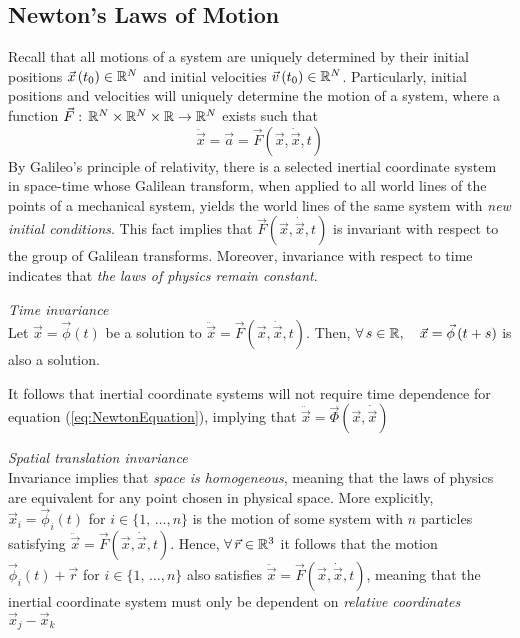 \documentclass{article}
\begin{document}
		\subsection{Newton's Laws of Motion}
		Recall that all motions of a system are uniquely determined by their initial positions $\vec{x} \left(t_0\right) \in \mathbb{R}^N$ and initial velocities $\vec{v} \left(t_0\right) \in \mathbb{R}^N $. Particularly, initial positions and velocities will uniquely determine the motion of a system, where a function $\vec{F}: \, \mathbb{R}^N \times \mathbb{R}^N \times \mathbb{R} \to \mathbb{R}^N$ exists such that
		\begin{equation}
			\label{eq:NewtonEquation}
			\boxed{\ddot{\vec{x}} = \vec{a} = \vec{F} \left(\vec{x}, \dot{\vec{x}}, t \right)}
		\end{equation}
		By Galileo's principle of relativity, there is a selected inertial coordinate system in space-time whose Galilean transform, when applied to all world lines of the points of a mechanical system, yields the world lines of the same system with \textit{new initial conditions}. This fact implies that $\vec{F}\left(\vec{x}, \dot{\vec{x}}, t\right)$ is invariant with respect to the group of Galilean transforms. Moreover, invariance with respect to time indicates that \textit{the laws of physics remain constant}. 
		\begin{exmp} \textit{Time invariance} \\
			Let $\vec{x} = \vec{\phi} (t)$ be a solution to $\ddot{\vec{x}} = \vec{F} \left(\vec{x}, \dot{\vec{x}}, t \right)$. Then, $\forall \, s \in \mathbb{R}, \quad \vec{x} = \vec{\phi} \left(t+s\right)$ is also a solution.
		\end{exmp}
		It follows that inertial coordinate systems will not require time dependence for equation (\ref{eq:NewtonEquation}), implying that $\ddot{\vec{x}} = \vec{\Phi} \left(\vec{x}, \dot{\vec{x}}\right)$
		\begin{exmp} \textit{Spatial translation invariance}\\
			Invariance implies that \textit{space is homogeneous}, meaning that the laws of physics are equivalent for any point chosen in physical space. More explicitly, $ \vec{x}_i = \vec{\phi}_i (t) $ for $ i \in \{1, \, \dots, n\}$ is the motion of some system with $n$ particles satisfying $\ddot{\vec{x}} = \vec{F} \left( \vec{x}, \dot{\vec{x}}, t \right)$. Hence, $\forall \, \vec{r} \in \mathbb{R}^3$ it follows that the motion $\vec{\phi}_i (t) + \vec{r}$ for $i \in \{1, \, \dots, n\}$ also satisfies $\ddot{\vec{x}} = \vec{F} \left( \vec{x}, \dot{\vec{x}}, t \right)$, meaning that the inertial coordinate system must only be dependent on \textit{relative coordinates} $\vec{x}_j - \vec{x}_k$
		\end{exmp}
\end{document}
